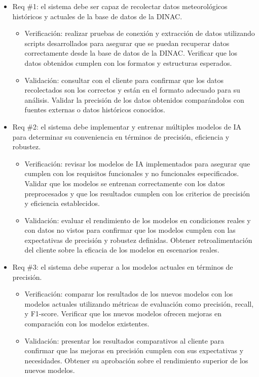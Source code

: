 \documentclass[
11pt, %
codirector, %
]{charter}
\begin{document}
\begin{itemize} 
\item Req \#1: el sistema debe ser capaz de recolectar datos meteorológicos históricos y actuales de la base de datos de la DINAC.

\begin{itemize}
	\item Verificación: realizar pruebas de conexión y extracción de datos utilizando scripts desarrollados para asegurar que se puedan recuperar datos correctamente desde la base de datos de la DINAC. Verificar que los datos obtenidos cumplen con los formatos y estructuras esperados.
	\item Validación: consultar con el cliente para confirmar que los datos recolectados son los correctos y están en el formato adecuado para su análisis. Validar la precisión de los datos obtenidos comparándolos con fuentes externas o datos históricos conocidos.
\end{itemize}

\item Req \#2: el sistema debe implementar y entrenar múltiples modelos de IA para determinar su conveniencia en términos de precisión, eficiencia y robustez.

\begin{itemize}
	\item Verificación: revisar los modelos de IA implementados para asegurar que cumplen con los requisitos funcionales y no funcionales especificados. Validar que los modelos se entrenan correctamente con los datos preprocesados y que los resultados cumplen con los criterios de precisión y eficiencia establecidos.
	\item Validación: evaluar el rendimiento de los modelos en condiciones reales y con datos no vistos para confirmar que los modelos cumplen con las expectativas de precisión y robustez definidas. Obtener retroalimentación del cliente sobre la eficacia de los modelos en escenarios reales.
\end{itemize}

\item Req \#3: el sistema debe superar a los modelos actuales en términos de precisión.

\begin{itemize}
	\item Verificación: comparar los resultados de los nuevos modelos con los modelos actuales utilizando métricas de evaluación como precisión, recall, y F1-score. Verificar que los nuevos modelos ofrecen mejoras en comparación con los modelos existentes.
	\item Validación: presentar los resultados comparativos al cliente para confirmar que las mejoras en precisión cumplen con sus expectativas y necesidades. Obtener su aprobación sobre el rendimiento superior de los nuevos modelos.
\end{itemize}


\end{itemize}
\end{document}
